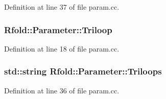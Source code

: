 Definition at line 37 of file param.\+cc.

\hypertarget{namespace_rfold_1_1_parameter_a7349c047e5809e731b6ab867fb74bf55}{
\subsubsection[{Triloop}]{ Rfold\+::\+Parameter\+::\+Triloop}}\label{namespace_rfold_1_1_parameter_a7349c047e5809e731b6ab867fb74bf55}


Definition at line 18 of file param.\+cc.

\hypertarget{namespace_rfold_1_1_parameter_ad65b27d73071fca1621f7f0cb02cacbc}{
\subsubsection[{Triloops}]{\setlength{\rightskip}{0pt plus 5cm}std\+::string Rfold\+::\+Parameter\+::\+Triloops}}\label{namespace_rfold_1_1_parameter_ad65b27d73071fca1621f7f0cb02cacbc}


Definition at line 36 of file param.\+cc.

